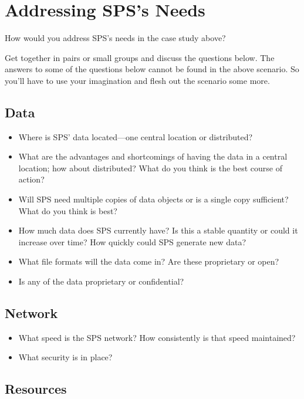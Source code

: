 \documentclass[10pt,oneside]{memoir}
\begin{document}
\section{Addressing SPS's Needs}

How would you address SPS's needs in the case study above?

Get together in pairs or small groups and discuss the questions below. The answers to some of the questions below cannot be found in the above scenario. So you'll have to use your imagination and flesh out the scenario some more.

\subsection{Data}

\begin{itemize}
 \item Where is SPS' data located---one central location or distributed?
 \item What are the advantages and shortcomings of having the data in a central location; how about distributed? What do you think is the best course of action?
 \item Will SPS need multiple copies of data objects or is a single copy sufficient? What do you think is best?
 \item How much data does SPS currently have? Is this a stable quantity or could it increase over time? How quickly could SPS generate new data?
 \item What file formats will the data come in? Are these proprietary or open?
 \item Is any of the data proprietary or confidential?
\end{itemize}

\subsection{Network}

\begin{itemize}
 \item What speed is the SPS network? How consistently is that speed maintained?
 \item What security is in place?
\end{itemize}

\subsection{Resources}
\end{document}
